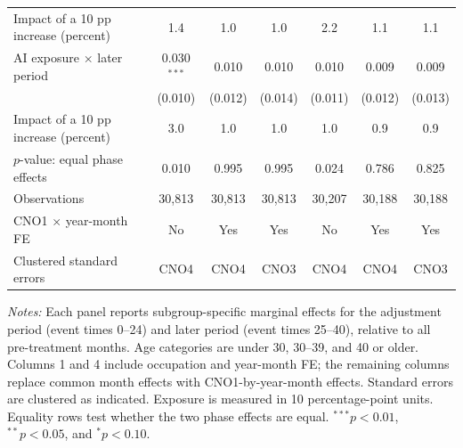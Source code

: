 \begin{table}[p]
\begin{threeparttable}
\begin{tabular}{@{}lcccccc@{}}
Impact of a 10 pp increase (percent) & 1.4 & 1.0 & 1.0 & 2.2 & 1.1 & 1.1 \\
\addlinespace
AI exposure $\times$ later period & 0.030$^{***}$ & 0.010 & 0.010 & 0.010 & 0.009 & 0.009 \\
 & (0.010) & (0.012) & (0.014) & (0.011) & (0.012) & (0.013) \\
Impact of a 10 pp increase (percent) & 3.0 & 1.0 & 1.0 & 1.0 & 0.9 & 0.9 \\
$p$-value: equal phase effects & 0.010 & 0.995 & 0.995 & 0.024 & 0.786 & 0.825 \\
Observations & 30,813 & 30,813 & 30,813 & 30,207 & 30,188 & 30,188 \\
\midrule
CNO1 $\times$ year-month FE & No & Yes & Yes & No & Yes & Yes \\
Clustered standard errors & CNO4 & CNO4 & CNO3 & CNO4 & CNO4 & CNO3 \\
\bottomrule
\end{tabular}
\begin{tablenotes}[flushleft]
\scriptsize
\item \emph{Notes:} Each panel reports subgroup-specific marginal effects for the adjustment period (event times 0--24) and later period (event times 25--40), relative to all pre-treatment months. Age categories are under 30, 30--39, and 40 or older. Columns 1 and 4 include occupation and year-month FE; the remaining columns replace common month effects with CNO1-by-year-month effects. Standard errors are clustered as indicated. Exposure is measured in 10 percentage-point units. Equality rows test whether the two phase effects are equal. $^{***}p<0.01$, $^{**}p<0.05$, and $^{*}p<0.10$.
\end{tablenotes}
\end{threeparttable}
\end{table}
